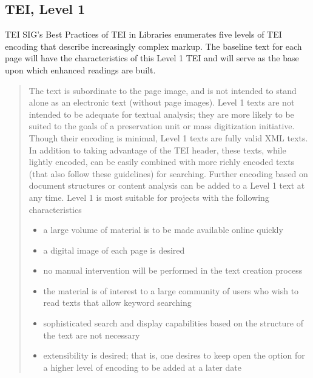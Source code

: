 \subsection{TEI, Level 1}
TEI SIG's Best Practices of TEI in Libraries enumerates five levels of TEI encoding that describe increasingly complex markup. The baseline text for each page will have the characteristics of this Level 1 TEI and will serve as the base upon which enhanced readings are built.
\begin{quote}
The text is subordinate to the page image, and is not intended to stand alone as an electronic text (without page images). Level 1 texts are not intended to be adequate for textual analysis; they are more likely to be suited to the goals of a preservation unit or mass digitization initiative. Though their encoding is minimal, Level 1 texts are fully valid XML texts. In addition to taking advantage of the TEI header, these texts, while lightly encoded, can be easily combined with more richly encoded texts (that also follow these guidelines) for searching. Further encoding based on document structures or content analysis can be added to a Level 1 text at any time.
Level 1 is most suitable for projects with the following characteristics
\begin{itemize}
    \item{a large volume of material is to be made available online quickly}
    \item{a digital image of each page is desired}
    \item{no manual intervention will be performed in the text creation process}
    \item{the material is of interest to a large community of users who wish to read texts that allow keyword searching}
    \item{sophisticated search and display capabilities based on the structure of the text are not necessary}
    \item{extensibility is desired; that is, one desires to keep open the option for a higher level of encoding to be added at a later date}
\end{itemize}
\cite{tei_sig_on_libraries_best_2011}
\end{quote}
